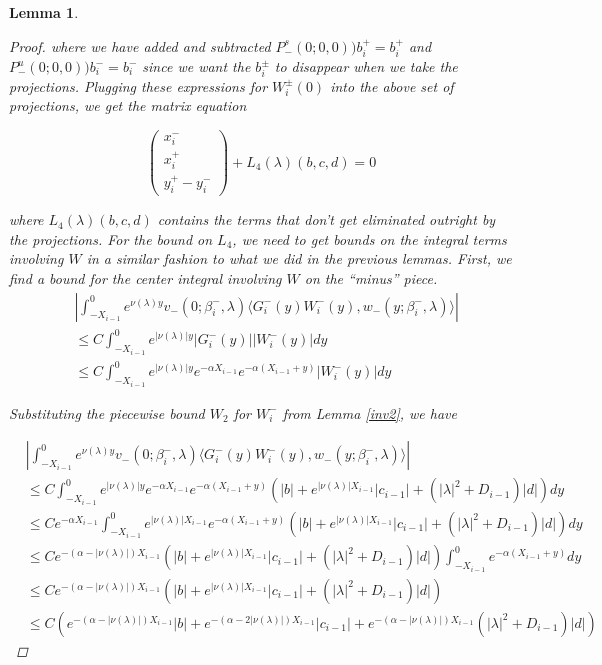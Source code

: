 \documentclass[12pt]{article}
\newtheorem{lemma}{Lemma}
\begin{document}
\begin{lemma}
\begin{proof}
where we have added and subtracted $P^s_-(0; 0, 0))b_i^+ = b_i^+$ and $P^u_-(0; 0, 0))b_i^- = b_i^-$ since we want the $b_i^\pm$ to disappear when we take the projections. Plugging these expressions for $W_i^\pm(0)$ into the above set of projections, we get the matrix equation

\[
\begin{pmatrix}x_i^- \\ x_i^+ \\ 
y_i^+ - y_i^- \end{pmatrix} + L_4(\lambda)(b, c, d) = 0
\]

where $L_4(\lambda)(b, c, d)$ contains the terms that don't get eliminated outright by the projections. For the bound on $L_4$, we need to get bounds on the integral terms involving $W$ in a similar fashion to what we did in the previous lemmas. First, we find a bound for the center integral involving $W$ on the ``minus'' piece.\\

\begin{align*}
&\left| \int_{-X_{i-1}}^0
e^{\nu(\lambda)y} v_-(0; \beta_i^-, \lambda) \langle G_i^-(y)W_i^-(y), w_-(y; \beta_i^-, \lambda) \rangle \right| \\
&\leq C \int_{-X_{i-1}}^0 e^{|\nu(\lambda)|y} |G_i^-(y)| |W_i^-(y)| dy \\
&\leq C \int_{-X_{i-1}}^0 e^{|\nu(\lambda)|y} e^{-\alpha X_{i-1}} e^{-\alpha(X_{i-1} + y)} |W_i^-(y)| dy
\end{align*}

Substituting the piecewise bound $W_2$ for $W_i^-$ from Lemma \ref{inv2}, we have

\begin{align*}
&\left| \int_{-X_{i-1}}^0
e^{\nu(\lambda)y} v_-(0; \beta_i^-, \lambda) \langle G_i^-(y)W_i^-(y), w_-(y; \beta_i^-, \lambda) \rangle \right| \\
&\leq C \int_{-X_{i-1}}^0 e^{|\nu(\lambda)|y} e^{-\alpha X_{i-1}} e^{-\alpha(X_{i-1} + y)} ( |b| + e^{|\nu(\lambda)|X_{i-1}}|c_{i-1}| + (|\lambda|^2 + D_{i-1})|d| )dy \\
&\leq C e^{-\alpha X_{i-1}} \int_{-X_{i-1}}^0 e^{|\nu(\lambda)|X_{i-1}} e^{-\alpha(X_{i-1} + y)} ( |b| + e^{|\nu(\lambda)|X_{i-1}}|c_{i-1}| + (|\lambda|^2 + D_{i-1})|d| )dy \\
&\leq C e^{-(\alpha - |\nu(\lambda)|) X_{i-1}} ( |b| + e^{|\nu(\lambda)|X_{i-1}}|c_{i-1}| + (|\lambda|^2 + D_{i-1})|d| ) \int_{-X_{i-1}}^0 e^{-\alpha(X_{i-1} + y)} dy \\
&\leq C e^{-(\alpha - |\nu(\lambda)|) X_{i-1}} ( |b| + e^{|\nu(\lambda)|X_{i-1}}|c_{i-1}| + (|\lambda|^2 + D_{i-1})|d| ) \\
&\leq C ( e^{-(\alpha - |\nu(\lambda)|) X_{i-1}} |b| + e^{-(\alpha - 2 |\nu(\lambda)|) X_{i-1}}|c_{i-1}| + e^{-(\alpha - |\nu(\lambda)|) X_{i-1}} (|\lambda|^2 + D_{i-1})|d| )
\end{align*}


\end{proof}
\end{lemma}
\end{document}
